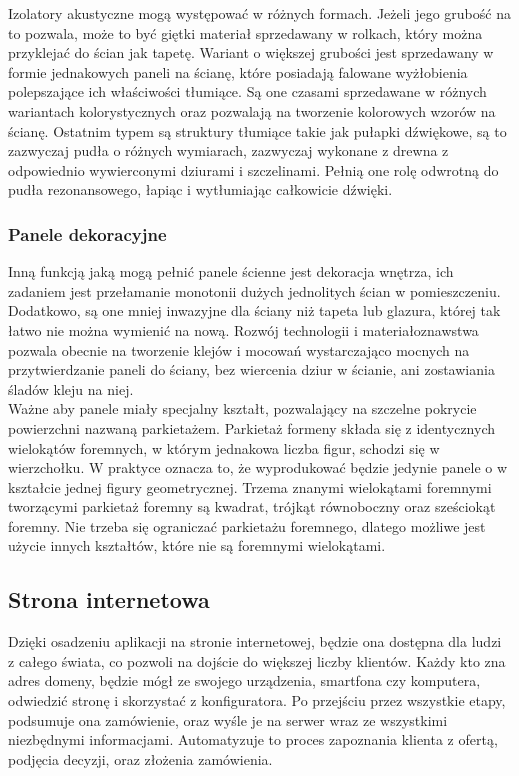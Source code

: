\documentclass{article} %
\begin{document}
        Izolatory akustyczne mogą występować w różnych formach. Jeżeli jego grubość na to pozwala, może to być giętki materiał sprzedawany w rolkach, który można przyklejać do ścian jak tapetę. Wariant o większej grubości jest sprzedawany w formie jednakowych paneli na ścianę, które posiadają falowane wyżłobienia polepszające ich właściwości tłumiące. Są one czasami sprzedawane w różnych wariantach kolorystycznych oraz pozwalają na tworzenie kolorowych wzorów na ścianę. Ostatnim typem są struktury tłumiące takie jak pułapki dźwiękowe, są to zazwyczaj pudła o różnych wymiarach, zazwyczaj wykonane z drewna z odpowiednio wywierconymi dziurami i szczelinami. Pełnią one rolę odwrotną do pudła rezonansowego, łapiąc i wytłumiając całkowicie dźwięki.
        \\
        
        \subsubsection{Panele dekoracyjne}
        Inną funkcją jaką mogą pełnić panele ścienne jest dekoracja wnętrza, ich zadaniem jest przełamanie monotonii dużych jednolitych ścian w pomieszczeniu. Dodatkowo, są one mniej inwazyjne dla ściany niż tapeta lub glazura, której tak łatwo nie można wymienić na nową. Rozwój technologii i materiałoznawstwa pozwala obecnie na tworzenie klejów i mocowań wystarczająco mocnych na przytwierdzanie paneli do ściany, bez wiercenia dziur w ścianie, ani zostawiania śladów kleju na niej.
        \\
        
        Ważne aby panele miały specjalny kształt, pozwalający na szczelne pokrycie powierzchni nazwaną parkietażem. Parkietaż formeny składa się z identycznych wielokątów foremnych, w którym jednakowa liczba figur, schodzi się w wierzchołku. W praktyce oznacza to, że wyprodukować będzie jedynie panele o w kształcie jednej figury geometrycznej. Trzema znanymi wielokątami foremnymi tworzącymi parkietaż foremny są kwadrat, trójkąt równoboczny oraz sześciokąt foremny. Nie trzeba się ograniczać parkietażu foremnego, dlatego możliwe jest użycie innych kształtów, które nie są foremnymi wielokątami.
        \\
    
    \subsection{Strona internetowa}
        Dzięki osadzeniu aplikacji na stronie internetowej, będzie ona dostępna dla ludzi z całego świata, co pozwoli na dojście do większej liczby klientów. Każdy kto zna adres domeny, będzie mógł ze swojego urządzenia, smartfona czy komputera, odwiedzić stronę i skorzystać z konfiguratora. Po przejściu przez wszystkie etapy, podsumuje ona zamówienie, oraz wyśle je na serwer wraz ze wszystkimi niezbędnymi informacjami. Automatyzuje to proces zapoznania klienta z ofertą, podjęcia decyzji, oraz złożenia zamówienia.
        \\
        
\end{document}
